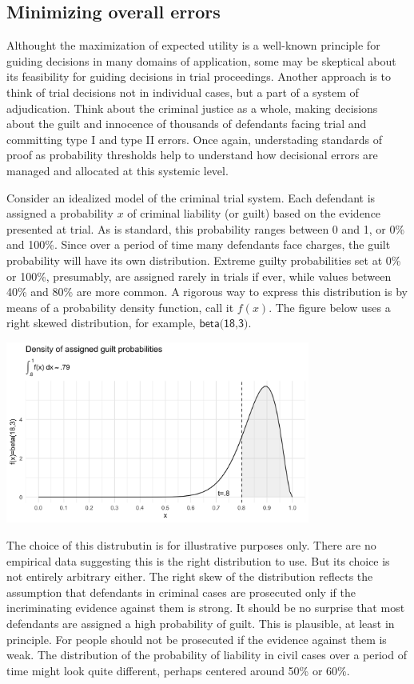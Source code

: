 \documentclass[10pt,dvipsnames,enabledeprecatedfontcommands]{scrartcl}
\begin{document}
\subsection{Minimizing overall errors}

Althought the maximization of expected utility is a well-known principle
for guiding decisions in many domains of application, some may be
skeptical about its feasibility for guiding decisions in trial
proceedings. Another approach is to think of trial decisions not in
individual cases, but a part of a system of adjudication. Think about
the criminal justice as a whole, making decisions about the guilt and
innocence of thousands of defendants facing trial and committing type I
and type II errors. Once again, understading standards of proof as
probability thresholds help to understand how decisional errors are
managed and allocated at this systemic level.

Consider an idealized model of the criminal trial system. Each defendant
is assigned a probability \(x\) of criminal liability (or guilt) based
on the evidence presented at trial. As is standard, this probability
ranges between 0 and 1, or 0\% and 100\%. Since over a period of time
many defendants face charges, the guilt probability will have its own
distribution. Extreme guilty probabilities set at 0\% or 100\%,
presumably, are assigned rarely in trials if ever, while values between
40\% and 80\% are more common. A rigorous way to express this
distribution is by means of a probability density function, call it
\(f(x)\). The figure below uses a right skewed distribution, for
example, \(\textsf{beta(18,3)}\).

\begin{center}
    \includegraphics[width=10cm]{beta(18,3)2.png}
\end{center}

\noindent The choice of this distrubutin is for illustrative purposes
only. There are no empirical data suggesting this is the right
distribution to use. But its choice is not entirely arbitrary either.
The right skew of the distribution reflects the assumption that
defendants in criminal cases are prosecuted only if the incriminating
evidence against them is strong. It should be no surprise that most
defendants are assigned a high probability of guilt. This is plausible,
at least in principle. For people should not be prosecuted if the
evidence against them is weak. The distribution of the probability of
liability in civil cases over a period of time might look quite
different, perhaps centered around 50\% or 60\%.
\end{document}
